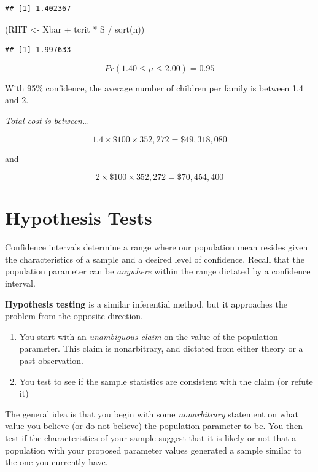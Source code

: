 \documentclass[
]{book}
\newenvironment{Shaded}{\begin{snugshade}}{\end{snugshade}}
\newcommand{\FunctionTok}[1]{\textcolor[rgb]{0.00,0.00,0.00}{#1}}
\newcommand{\NormalTok}[1]{#1}
\newcommand{\OtherTok}[1]{\textcolor[rgb]{0.56,0.35,0.01}{#1}}
\newcommand{\SpecialCharTok}[1]{\textcolor[rgb]{0.00,0.00,0.00}{#1}}
\begin{document}
\begin{verbatim}
## [1] 1.402367
\end{verbatim}

\begin{Shaded}
\begin{Highlighting}[]
\NormalTok{(RHT }\OtherTok{\textless{}{-}}\NormalTok{ Xbar }\SpecialCharTok{+}\NormalTok{ tcrit }\SpecialCharTok{*}\NormalTok{ S }\SpecialCharTok{/} \FunctionTok{sqrt}\NormalTok{(n))}
\end{Highlighting}
\end{Shaded}

\begin{verbatim}
## [1] 1.997633
\end{verbatim}

\[Pr(1.40 \leq \mu \leq 2.00) = 0.95\]

With 95\% confidence, the average number of children per family is between 1.4 and 2.

\emph{Total cost is between\ldots{}}

\[1.4 \times \$100 \times 352,272 = \$49,318,080\]

and

\[2 \times \$100 \times 352,272 = \$70,454,400\]

\hypertarget{HT}{%
\chapter{Hypothesis Tests}\label{HT}}

Confidence intervals determine a range where our population mean resides given the characteristics of a sample and a desired level of confidence. Recall that the population parameter can be \emph{anywhere} within the range dictated by a confidence interval.

\textbf{Hypothesis testing} is a similar inferential method, but it approaches the problem from the opposite direction.

\begin{enumerate}
\def\labelenumi{\arabic{enumi}.}
\item
  You start with an \emph{unambiguous claim} on the value of the population parameter. This claim is nonarbitrary, and dictated from either theory or a past observation.
\item
  You test to see if the sample statistics are consistent with the claim (or refute it)
\end{enumerate}

The general idea is that you begin with some \emph{nonarbitrary} statement on what value you believe (or do not believe) the population parameter to be. You then test if the characteristics of your sample suggest that it is likely or not that a population with your proposed parameter values generated a sample similar to the one you currently have.
\end{document}
